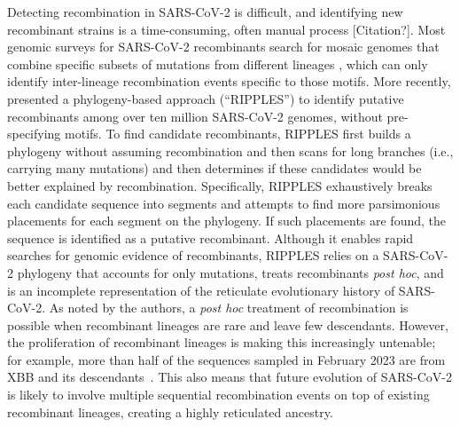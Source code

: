 \documentclass{article}
\begin{document}
Detecting recombination in SARS-CoV-2 is difficult, and identifying new
recombinant strains is a time-consuming, often manual process [Citation?].
Most genomic surveys for SARS-CoV-2 recombinants search for mosaic genomes that
combine specific subsets of mutations from different lineages
\citep[e.g.][]{VanInsberghe2021-eu,Jackson2021-ik,Wertheim2022-hj,Sekizuka2022-xz},
which can only identify inter-lineage recombination events specific to those motifs.
More recently, \cite{Turakhia2022-it} presented a
phylogeny-based approach (``RIPPLES'') to identify putative recombinants among
over ten million SARS-CoV-2 genomes, without pre-specifying motifs. To find
candidate recombinants, RIPPLES first builds a phylogeny without assuming
recombination and then scans for long branches (i.e., carrying many mutations)
and then determines if these candidates would be better explained by
recombination. Specifically, RIPPLES exhaustively breaks each candidate
sequence into segments and attempts to find more parsimonious placements for
each segment on the phylogeny. If such placements are found, the sequence is
identified as a putative recombinant. Although it enables rapid searches for
genomic evidence of recombinants, RIPPLES relies on a SARS-CoV-2 phylogeny that
accounts for only mutations, treats recombinants \textit{post hoc}, and is an
incomplete representation of the reticulate evolutionary history of SARS-CoV-2.
As noted by the authors, a \textit{post hoc} treatment of recombination is
possible when recombinant lineages are rare and leave few descendants. However,
the proliferation of recombinant lineages is making this increasingly
untenable; for example, more than half of the sequences sampled in February 2023
are from XBB and its descendants~\citep{Chen2022-pz}. This also means that
future evolution of SARS-CoV-2 is likely to involve multiple sequential
recombination events on top of existing recombinant lineages, creating a highly
reticulated ancestry.

\end{document}
